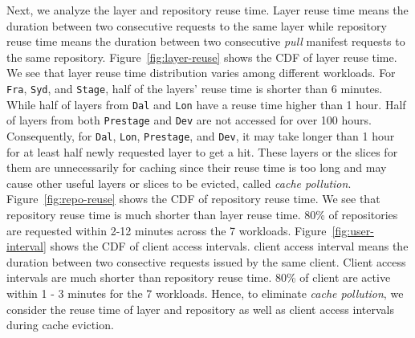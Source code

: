 Next, we analyze the layer and repository reuse time.
Layer reuse time means the duration between two consecutive requests to the same layer
while repository reuse time means the duration between two consecutive \emph{pull} manifest requests to the same repository.
Figure~\ref{fig:layer-reuse} shows the CDF of layer reuse time. 
We see that layer reuse time distribution varies among different workloads.
For \texttt{Fra}, \texttt{Syd}, and \texttt{Stage},
half of the layers' reuse time is shorter than 6 minutes.
While half of layers from \texttt{Dal} and \texttt{Lon} have a reuse time higher than 1 hour.
Half of layers from both \texttt{Prestage} and \texttt{Dev} are not accessed for over 100 hours.
Consequently, for \texttt{Dal}, \texttt{Lon}, \texttt{Prestage}, and \texttt{Dev}, 
it may take longer than 1 hour for at least half newly requested layer to get a hit. 
These layers or the slices for them are unnecessarily for caching since 
their reuse time is too long and may cause other useful layers or slices to be evicted, called \emph{cache pollution}.
Figure~\ref{fig:repo-reuse} shows the CDF of repository reuse time.
We see that repository reuse time is much shorter than layer reuse time.
80\% of repositories are requested within 2-12 minutes across the 7 workloads.
Figure~\ref{fig:user-interval} shows the CDF of client access intervals.
client access interval means the duration between two consective requests issued by the same client.
Client access intervals are much shorter than repository reuse time.
80\% of client are active within 1 - 3 minutes for the 7 workloads. 
Hence, to eliminate \emph{cache pollution},
we consider the reuse time of layer and repository as well as client access intervals during
cache eviction.